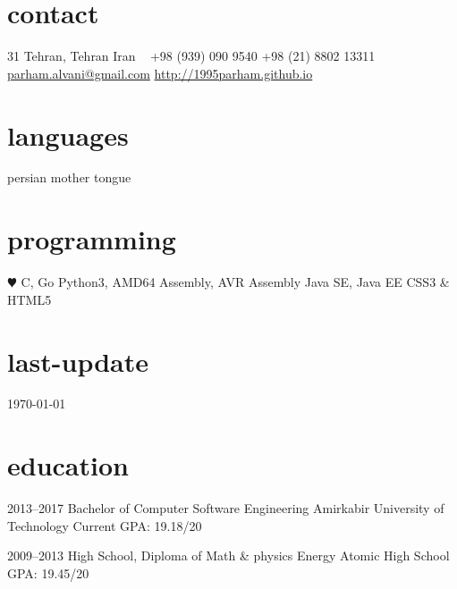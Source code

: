 \documentclass[]{friggeri-cv} %
\begin{document}


\begin{aside} %
\section{contact}
31
Tehran, Tehran
Iran
~
+98 (939) 090 9540
+98 (21) 8802 13311
~
\href{mailto:parham.alvani@gmail.com}{parham.alvani@gmail.com}
\href{http://1995parham.github.io/}{http://1995parham.github.io}
\section{languages}
persian mother tongue
\section{programming}
{\color{red} $\varheartsuit$} C, Go
Python3, AMD64 Assembly, AVR Assembly
Java SE, Java EE
CSS3 \& HTML5
\section{last-update}
\today
\end{aside}


\section{education}

\begin{entrylist}


\entry
{2013--2017}
{Bachelor {\normalfont of Computer Software Engineering}}
{Amirkabir University of Technology}
{Current GPA: 19.18/20}


\entry
{2009--2013}
{High School, {\normalfont Diploma of Math \& physics}}
{Energy Atomic High School}
{GPA: 19.45/20}



\end{entrylist}
\end{document}

